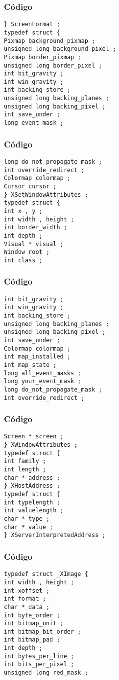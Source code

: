 \documentclass{beamer}
\begin{document}
\begin{frame}[fragile]
\frametitle{C\'odigo}
\begin{verbatim}
} ScreenFormat ; 
typedef struct { 
Pixmap background_pixmap ; 
unsigned long background_pixel ; 
Pixmap border_pixmap ; 
unsigned long border_pixel ; 
int bit_gravity ; 
int win_gravity ; 
int backing_store ; 
unsigned long backing_planes ; 
unsigned long backing_pixel ; 
int save_under ; 
long event_mask ; 
\end{verbatim}
\end{frame}
\begin{frame}[fragile]
\frametitle{C\'odigo}
\begin{verbatim}
long do_not_propagate_mask ; 
int override_redirect ; 
Colormap colormap ; 
Cursor cursor ; 
} XSetWindowAttributes ; 
typedef struct { 
int x , y ; 
int width , height ; 
int border_width ; 
int depth ; 
Visual * visual ; 
Window root ; 
int class ; 
\end{verbatim}
\end{frame}
\begin{frame}[fragile]
\frametitle{C\'odigo}
\begin{verbatim}
int bit_gravity ; 
int win_gravity ; 
int backing_store ; 
unsigned long backing_planes ; 
unsigned long backing_pixel ; 
int save_under ; 
Colormap colormap ; 
int map_installed ; 
int map_state ; 
long all_event_masks ; 
long your_event_mask ; 
long do_not_propagate_mask ; 
int override_redirect ; 
\end{verbatim}
\end{frame}
\begin{frame}[fragile]
\frametitle{C\'odigo}
\begin{verbatim}
Screen * screen ; 
} XWindowAttributes ; 
typedef struct { 
int family ; 
int length ; 
char * address ; 
} XHostAddress ; 
typedef struct { 
int typelength ; 
int valuelength ; 
char * type ; 
char * value ; 
} XServerInterpretedAddress ; 
\end{verbatim}
\end{frame}
\begin{frame}[fragile]
\frametitle{C\'odigo}
\begin{verbatim}
typedef struct _XImage { 
int width , height ; 
int xoffset ; 
int format ; 
char * data ; 
int byte_order ; 
int bitmap_unit ; 
int bitmap_bit_order ; 
int bitmap_pad ; 
int depth ; 
int bytes_per_line ; 
int bits_per_pixel ; 
unsigned long red_mask ; 
\end{verbatim}
\end{frame}
\end{document}
